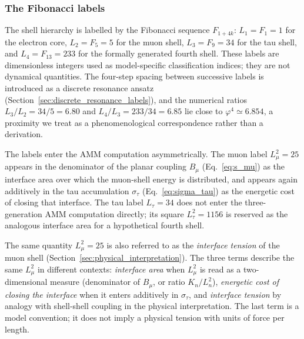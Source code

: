 \documentclass[10pt,a4paper]{article}
\begin{document}
\subsubsection*{The Fibonacci labels}
The shell hierarchy is labelled by the Fibonacci sequence $F_{1+4k}$:
$L_1 = F_1 = 1$ for the electron core, $L_2 = F_5 = 5$ for the muon
shell, $L_3 = F_9 = 34$ for the tau shell, and $L_4 = F_{13} = 233$ for
the formally generated fourth shell. These labels are dimensionless
integers used as model-specific classification indices; they are not
dynamical quantities. The four-step spacing between successive labels
is introduced as a discrete resonance ansatz
(Section~\ref{sec:discrete_resonance_labels}), and the numerical ratios
$L_3/L_2 = 34/5 = 6.80$ and $L_4/L_3 = 233/34 = 6.85$ lie close to
$\varphi^4 \simeq 6.854$, a proximity we treat as a phenomenological
correspondence rather than a derivation.

The labels enter the AMM computation asymmetrically. The muon label
$L_\mu^2 = 25$ appears in the denominator of the planar coupling
$B_\mu$ (Eq.~\eqref{eq:s_mu}) as the interface area over which the
muon-shell energy is distributed, and appears again additively in the
tau accumulation $\sigma_\tau$ (Eq.~\eqref{eq:sigma_tau}) as the
energetic cost of closing that interface. The tau label $L_\tau = 34$
does not enter the three-generation AMM computation directly; its
square $L_\tau^2 = 1156$ is reserved as the analogous interface area
for a hypothetical fourth shell.

The same quantity $L_\mu^2 = 25$ is also referred to as the
\emph{interface tension} of the muon shell
(Section~\ref{sec:physical_interpretation}). The three terms describe
the same $L_\mu^2$ in different contexts: \emph{interface area} when
$L_\mu^2$ is read as a two-dimensional measure (denominator of
$B_\mu$, or ratio $K_n/L_n^2$), \emph{energetic cost of closing the
	interface} when it enters additively in $\sigma_\tau$, and
\emph{interface tension} by analogy with shell-shell coupling in the
physical interpretation. The last term is a model convention; it does
not imply a physical tension with units of force per length.
\end{document}
